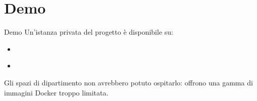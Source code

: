 \documentclass{beamer}
\begin{document}
\section{Demo}
\begin{frame}{Demo}
	Un'istanza privata del progetto \`e disponibile su:
	\begin{itemize}
		\item \href{http://team13.hjkl.gq:8000/swagger/index.html}{}
		\item \href{http://team13.hjkl.gq}{}
	\end{itemize}
	Gli spazi di dipartimento non avrebbero potuto ospitarlo: offrono una gamma di
	immagini Docker troppo limitata.
\end{frame}
\end{document}
